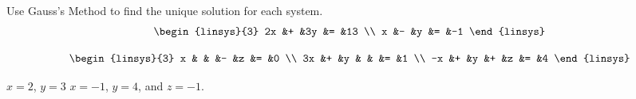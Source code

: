 

\begin{Exercise}[
name={},
title={}, 
difficulty=0,
origin={\cite{JH}}]
Use Gauss's Method to find the unique solution for each system.
\Question
\[
\begin{linsys}{3}
      2x  &+  &3y  &=  &13  \\
          x   &-  &y   &=  &-1
\end{linsys}
\]

\Question
\[
\begin{linsys}{3}
          x   &  &  &-  &z  &=  &0  \\
          3x  &+ &y &   &   &=  &1  \\
          -x  &+ &y &+  &z  &=  &4
\end{linsys}
\]

\end{Exercise}

\begin{Answer}
\Question $x=2$, $y=3$
\Question $x=-1$, $y=4$, and $z=-1$.
\end{Answer}
